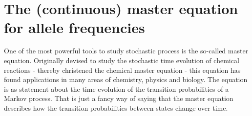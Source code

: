 \section{The (continuous) master equation for allele frequencies} \label{sec_master_eq}

One of the most powerful tools to study stochastic process is the so-called
master equation. Originally devised to study the stochastic time evolution of
chemical reactions - thereby christened the chemical master equation - this
equation has found applications in many areas of chemistry, physics and biology.
The equation is as statement about the time evolution of the transition
probabilities of a Markov process. That is just a fancy way of saying that the
master equation describes how the transition probabilities between states change
over time.


